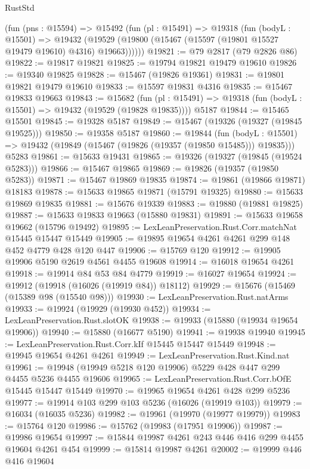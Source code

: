 \begin{lexlean}{RustStd}
\begin{coremodule}
    (fun (pns : @15594) =>
    @15492
      (fun (pl : @15491) =>
      @19318
        (fun (bodyL : @15501) =>
        @19432 (@19529 (@19800 (@15467 (@15597 (@19801 @15527 @19479 @19610) @4316) @19663))))))
@19821 := @79 @2817 (@79 @2826 @86)
@19822 := @19817 @19821
@19825 := @19794 @19821 @19479 @19610
@19826 := @19340 @19825
@19828 := @15467 (@19826 @19361)
@19831 := @19801 @19821 @19479 @19610
@19833 := @15597 @19831 @4316
@19835 := @15467 @19833 @19663
@19843 := @15682
    (fun (pl : @15491) => @19318 (fun (bodyL : @15501) => @19432 (@19529 (@19828 @19835))))
    @5187
@19844 := @15465 @15501
@19845 := @19328 @5187
@19849 := @15467 (@19326 (@19327 (@19845 @19525)))
@19850 := @19358 @5187
@19860 := @19844
    (fun (bodyL : @15501) => @19432 (@19849 (@15467 (@19826 (@19357 (@19850 @15485))) @19835)))
    @5283
@19861 := @15633 @19431
@19865 := @19326 (@19327 (@19845 (@19524 @5283)))
@19866 := @15467 @19865
@19869 := @19826 (@19357 (@19850 @5283))
@19871 := @15467 @19869 @19835
@19874 := @19861 (@19866 @19871) @18183
@19878 := @15633 @19865 @19871 (@15791 @19325)
@19880 := @15633 @19869 @19835
@19881 := @15676 @19339
@19883 := @19880 (@19881 @19825)
@19887 := @15633 @19833 @19663 (@15880 @19831)
@19891 := @15633 @19658 @19662 (@15796 @19492)
@19895 := LexLeanPreservation.Rust.Corr.matchNat @15445 @15447 @15449
@19905 := @19895 @19654 @4261 @4261 @299 @148 @452 @4779 @428 @120 @447
@19906 := @15769 @120
@19912 := @19905 @19906 @5190 @2619 @4561 @4455 @19608
@19914 := @16018 @19654 @4261
@19918 := @19914 @84 @53 @84 @4779
@19919 := @16027 @19654
@19924 := @19912 (@19918 (@16026 (@19919 @84)) @18112)
@19929 := @15676 (@15469 (@15389 @98 (@15540 @98)))
@19930 := LexLeanPreservation.Rust.natArms
@19933 := @19924 (@19929 (@19930 @452))
@19934 := LexLeanPreservation.Rust.slotOK
@19938 := @19933 (@15880 (@19934 @19654 @19906))
@19940 := @15880 (@16677 @5190)
@19941 := @19938 @19940
@19945 := LexLeanPreservation.Rust.Corr.kIf @15445 @15447 @15449
@19948 := @19945 @19654 @4261 @4261
@19949 := LexLeanPreservation.Rust.Kind.nat
@19961 := @19948 (@19949 @5218 @120 @19906) @5229 @428 @447 @299 @4455 @5236 @4455 @19606
@19965 := LexLeanPreservation.Rust.Corr.bOfE @15445 @15447 @15449
@19970 := @19965 @19654 @4261 @428 @299 @5236
@19977 := @19914 @103 @299 @103 @5236 (@16026 (@19919 @103))
@19979 := @16034 (@16035 @5236)
@19982 := @19961 (@19970 (@19977 @19979))
@19983 := @15764 @120
@19986 := @15762 (@19983 (@17951 @19906))
@19987 := @19986 @19654
@19997 := @15844 @19987 @4261 @243 @446 @416 @299 @4455 @19604 @4261 @454
@19999 := @15814 @19987 @4261
@20002 := @19999 @446 @416 @19604

\end{coremodule}
\end{lexlean}
